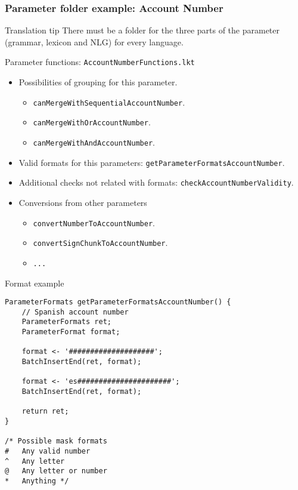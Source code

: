 \documentclass[11pt]{beamer}
\begin{document}
\begin{frame}
\frametitle{Parameter folder example: Account Number}
	\scriptsize
	\begin{block}{Translation tip}
		There must be a folder for the three parts of the parameter (grammar, lexicon and NLG) for every language.
	\end{block}
	\pause
	\scriptsize
	\begin{block}{Parameter functions: \texttt{AccountNumberFunctions.lkt}}
		\begin{itemize}
			\item Possibilities of grouping for this parameter.
			\begin{itemize}
				\item \texttt{canMergeWithSequentialAccountNumber}. 
				\item \texttt{canMergeWithOrAccountNumber}.
				\item \texttt{canMergeWithAndAccountNumber}.
			\end{itemize}
			\item Valid formats for this parameters: \texttt{getParameterFormatsAccountNumber}.
			\item Additional checks not related with formats: \texttt{checkAccountNumberValidity}.
			\item Conversions from other parameters
			\begin{itemize}
				\item \texttt{convertNumberToAccountNumber}.
				\item \texttt{convertSignChunkToAccountNumber}.
				\item \texttt{...}
			\end{itemize}
		\end{itemize}
	\end{block}
\end{frame}

\begin{frame}[fragile]
	\begin{block}{Format example}
		\scriptsize
		\begin{lstlisting}[language=lekta]
ParameterFormats getParameterFormatsAccountNumber() {
	// Spanish account number
	ParameterFormats ret;
	ParameterFormat format;

	format <- '####################';
	BatchInsertEnd(ret, format);

	format <- 'es######################';
	BatchInsertEnd(ret, format);

	return ret;
}

/* Possible mask formats
#   Any valid number
^   Any letter 
@   Any letter or number
*   Anything */
		\end{lstlisting}
	\end{block}
\end{frame}
\end{document}
